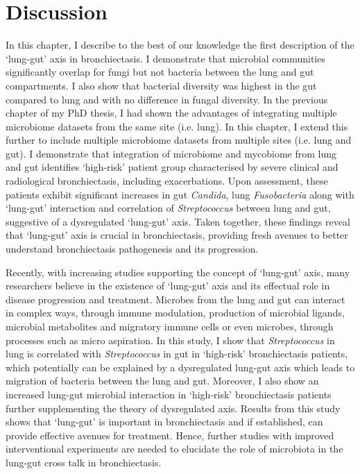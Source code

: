 \section{Discussion}

In this chapter, I describe to the best of our knowledge the first description of the `lung-gut' axis in bronchiectasis.
I demonstrate that microbial communities significantly overlap for fungi but not bacteria between the lung and gut compartments. I also show that bacterial diversity was highest in the gut compared to lung and with no difference in fungal diversity. In the previous chapter of my PhD thesis, I had shown the advantages of integrating multiple microbiome datasets from the same site (i.e. lung). In this chapter, I extend this further to include multiple microbiome datasets from multiple sites (i.e. lung and gut). I demonstrate that integration of microbiome and mycobiome from lung and gut identifies `high-risk' patient group characterised by severe clinical and radiological bronchiectasis, including exacerbations. Upon assessment, these patients exhibit significant increases in gut \textit{Candida}, lung \textit{Fusobacteria} along with `lung-gut' interaction  and correlation of \textit{Streptococcus} between lung and gut, suggestive of a dysregulated `lung-gut' axis. Taken together, these findings reveal that `lung-gut' axis is crucial in bronchiectasis, providing fresh avenues to better understand bronchiectasis pathogenesis and its progression. 

Recently, with increasing studies supporting the concept of `lung-gut' axis, many researchers believe in the existence of `lung-gut' axis and its effectual role in disease progression and treatment. Microbes from the lung and gut can interact in complex ways, through immune modulation, production of microbial ligands, microbial metabolites and migratory immune cells or even microbes, through processes such as micro aspiration. In this study, I show that \textit{Streptococcus} in lung is correlated with \textit{Streptococcus} in gut in `high-risk' bronchiectasis patients, which potentially can be explained by a dysregulated lung-gut axis which leads to migration of bacteria between the lung and gut. Moreover, I also show an increased lung-gut microbial interaction in `high-risk' bronchiectasis patients further supplementing the theory of dysregulated axis. Results from this study shows that `lung-gut' is important in bronchiectasis and if established, can provide effective avenues for treatment. Hence, further studies with improved interventional experiments are needed to elucidate the role of microbiota in the lung-gut cross talk in bronchiectasis.  

